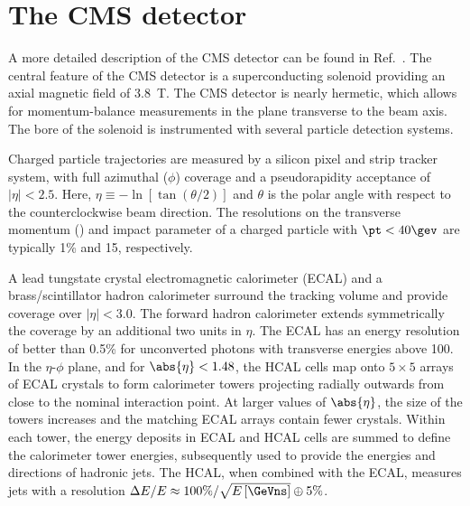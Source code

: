 \section{The CMS detector}
\label{sec:detector}

A more detailed description of the CMS detector can be found in
Ref.~\cite{ref:CMS}. The central feature of the CMS detector is a
superconducting solenoid providing an axial magnetic field of
3.8~T. The CMS detector is nearly hermetic, which allows for
momentum-balance measurements in the plane transverse to the beam
axis. The bore of the solenoid is instrumented with several particle
detection systems.

Charged particle trajectories are measured by a
silicon pixel and strip tracker system, with full azimuthal ($\phi$)
coverage and a pseudorapidity acceptance of $|\eta| < 2.5$. Here,
$\eta \equiv -\ln [ \tan (\theta/2) ]$ and $\theta$ is the polar angle
with respect to the counterclockwise beam direction. The resolutions
on the transverse momentum (\pt) and impact parameter of a charged
particle with $\pt < 40\gev$ are typically 1\% and 15\mum,
respectively.

A lead tungstate crystal electromagnetic calorimeter (ECAL) and a
brass/scintillator hadron calorimeter surround the tracking volume and
provide coverage over $|\eta| < 3.0$. The forward hadron calorimeter
extends symmetrically the coverage by an additional two units in
$\eta$.  The ECAL has an energy resolution of better than 0.5\% for
unconverted photons with transverse energies above 100\GeV.  In the
$\eta$-$\phi$ plane, and for $\abs{\eta}< 1.48$, the HCAL cells map
onto $5 \times 5$ arrays of ECAL crystals to form calorimeter towers
projecting radially outwards from close to the nominal interaction
point. At larger values of $\abs{ \eta }$, the size of the towers
increases and the matching ECAL arrays contain fewer crystals. Within
each tower, the energy deposits in ECAL and HCAL cells are summed to
define the calorimeter tower energies, subsequently used to provide
the energies and directions of hadronic jets. The HCAL, when combined
with the ECAL, measures jets with a resolution $\Delta E/E \approx
100\% / \sqrt{E\,[\GeVns]} \oplus 5\%$.



